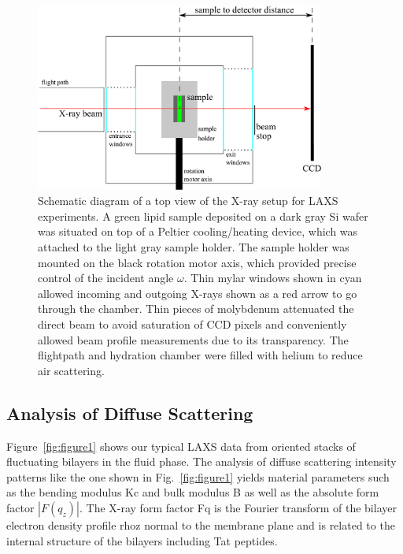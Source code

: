 \begin{figure}[p]
  \centering
  \includegraphics[width=0.85\textwidth]{figures/Tat/MMs/chamber_geometry}
  \caption[Schematic diagram of a top view of the X-ray setup for LAXS experiments]
  {Schematic diagram of a top view of the X-ray setup for LAXS experiments.
  A green lipid sample deposited on a dark gray Si wafer 
  was situated on top of a Peltier cooling/heating
  device, which was attached to the light gray sample holder. 
  The sample holder was mounted on the black rotation motor axis, which provided 
  precise control of the incident angle $\omega$. Thin mylar windows shown 
  in cyan allowed incoming
  and outgoing X-rays shown as a red arrow to go through the chamber.
  Thin pieces of molybdenum attenuated
  the direct beam to avoid saturation of CCD pixels and conveniently allowed 
  beam profile measurements due to its transparency. The flightpath and hydration chamber
  were filled with helium to reduce air scattering.}
  \label{fig:x-ray_setup}
\end{figure}

\subsection{Analysis of Diffuse Scattering}\label{sec:diffuse_analysis}
Figure~\ref{fig:figure1} shows our typical LAXS data 
from oriented stacks of fluctuating bilayers in the fluid phase. 
The analysis of diffuse scattering 
intensity patterns like the one shown in Fig.~\ref{fig:figure1} yields material 
parameters such as the bending modulus \gls{Kc} and bulk modulus \gls{B} as well as
the absolute form factor $|F(q_z)|$. 
The X-ray form factor \gls{Fq} is the Fourier transform of the bilayer electron 
density profile \gls{rhoz} normal to the membrane plane 
and is related to the internal structure of the
bilayers including Tat peptides.

